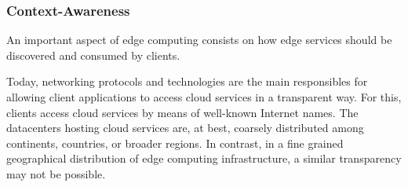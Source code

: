 

\subsubsection{Context-Awareness}

An important aspect of edge computing consists on how edge services should be discovered and consumed by clients. 

Today, networking protocols and technologies are the main responsibles for allowing client applications to access cloud services in a transparent way. For this, clients access cloud services by means of well-known Internet names. The datacenters hosting cloud services are, at best, coarsely distributed among continents, countries, or broader regions. 
In contrast, in a fine grained geographical distribution of edge computing infrastructure, a similar transparency may not be possible. 

%
%
%

